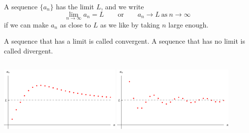 \begin{frame}
\begin{definition}
A sequence $\{ a_n\}$ has the limit $L$, and we write
\[
\lim_{n\to\infty}a_n = L \qquad \textrm{or}\qquad a_n\to L \ \textrm{as} \ n\to \infty
\]
if we can make $a_n$ as close to $L$ as we like by taking $n$ large enough.
\end{definition}
\begin{definition}[Convergent]
A sequence that has a limit is called convergent.  A sequence that has no limit is called divergent.
\end{definition}
\begin{columns}[c]
\includegraphics[width=6cm]{sequences/pictures/12-01-limita.pdf}%
\includegraphics[width=6cm]{sequences/pictures/12-01-limitb.pdf}%
\end{columns}
\end{frame}
